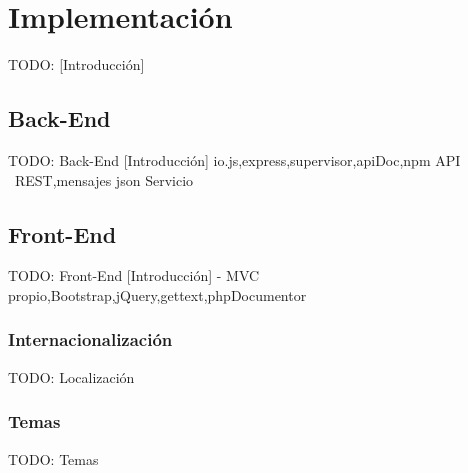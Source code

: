 \chapter{Implementación\label{cap:implementacion}}

TODO: [Introducción]


\section{Back-End\label{sec:imp:back_end}}

TODO: Back-End
  [Introducción]
  {io.js,express,supervisor,apiDoc,npm}
  {API ~REST,mensajes json}
  {Servicio}


\section{Front-End\label{sec:imp:front_end}}

TODO: Front-End
  [Introducción]
  - {MVC propio,Bootstrap,jQuery,gettext,phpDocumentor}


\subsection{Internacionalización\label{ssec:imp:internacionalizacion}}

TODO: Localización


\subsection{Temas\label{ssec:imp:temas}}

TODO: Temas